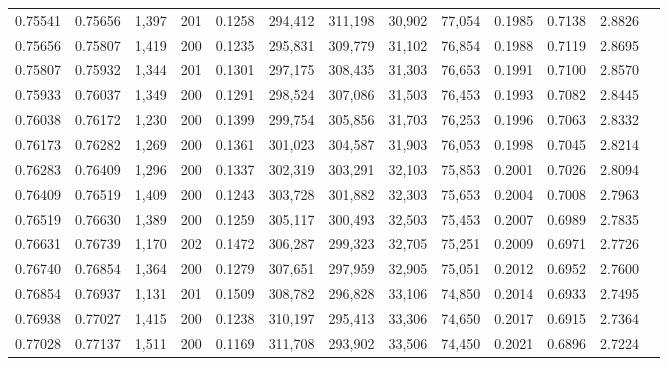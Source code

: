 \begin{tabular}{rrrrrrrrrrrrr}
0.75541 & 0.75656 & 1,397 & 201 &                                     0.1258 & 294,412 & 311,198 &  30,902 &  77,054 & 0.1985 & 0.7138 & 2.8826 \\
0.75656 & 0.75807 & 1,419 & 200 &                                     0.1235 & 295,831 & 309,779 &  31,102 &  76,854 & 0.1988 & 0.7119 & 2.8695 \\
0.75807 & 0.75932 & 1,344 & 201 &                                     0.1301 & 297,175 & 308,435 &  31,303 &  76,653 & 0.1991 & 0.7100 & 2.8570 \\
0.75933 & 0.76037 & 1,349 & 200 &                                     0.1291 & 298,524 & 307,086 &  31,503 &  76,453 & 0.1993 & 0.7082 & 2.8445 \\
0.76038 & 0.76172 & 1,230 & 200 &                                     0.1399 & 299,754 & 305,856 &  31,703 &  76,253 & 0.1996 & 0.7063 & 2.8332 \\
0.76173 & 0.76282 & 1,269 & 200 &                                     0.1361 & 301,023 & 304,587 &  31,903 &  76,053 & 0.1998 & 0.7045 & 2.8214 \\
0.76283 & 0.76409 & 1,296 & 200 &                                     0.1337 & 302,319 & 303,291 &  32,103 &  75,853 & 0.2001 & 0.7026 & 2.8094 \\
0.76409 & 0.76519 & 1,409 & 200 &                                     0.1243 & 303,728 & 301,882 &  32,303 &  75,653 & 0.2004 & 0.7008 & 2.7963 \\
0.76519 & 0.76630 & 1,389 & 200 &                                     0.1259 & 305,117 & 300,493 &  32,503 &  75,453 & 0.2007 & 0.6989 & 2.7835 \\
0.76631 & 0.76739 & 1,170 & 202 &                                     0.1472 & 306,287 & 299,323 &  32,705 &  75,251 & 0.2009 & 0.6971 & 2.7726 \\
0.76740 & 0.76854 & 1,364 & 200 &                                     0.1279 & 307,651 & 297,959 &  32,905 &  75,051 & 0.2012 & 0.6952 & 2.7600 \\
0.76854 & 0.76937 & 1,131 & 201 &                                     0.1509 & 308,782 & 296,828 &  33,106 &  74,850 & 0.2014 & 0.6933 & 2.7495 \\
0.76938 & 0.77027 & 1,415 & 200 &                                     0.1238 & 310,197 & 295,413 &  33,306 &  74,650 & 0.2017 & 0.6915 & 2.7364 \\
0.77028 & 0.77137 & 1,511 & 200 &                                     0.1169 & 311,708 & 293,902 &  33,506 &  74,450 & 0.2021 & 0.6896 & 2.7224 \\

\end{tabular}
